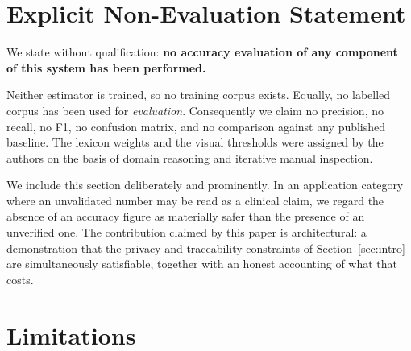 \documentclass[runningheads]{llncs}
\begin{document}
\section{Explicit Non-Evaluation Statement}
\label{sec:noeval}

We state without qualification: \textbf{no accuracy evaluation of any
component of this system has been performed.}

Neither estimator is trained, so no training corpus exists. Equally, no
labelled corpus has been used for \emph{evaluation}. Consequently we claim no
precision, no recall, no F1, no confusion matrix, and no comparison against
any published baseline. The lexicon weights and the visual thresholds were
assigned by the authors on the basis of domain reasoning and iterative manual
inspection.

We include this section deliberately and prominently. In an application
category where an unvalidated number may be read as a clinical claim, we
regard the absence of an accuracy figure as materially safer than the presence
of an unverified one. The contribution claimed by this paper is architectural:
a demonstration that the privacy and traceability constraints of
Section~\ref{sec:intro} are simultaneously satisfiable, together with an
honest accounting of what that costs.

\section{Limitations}
\label{sec:limits}
\end{document}
